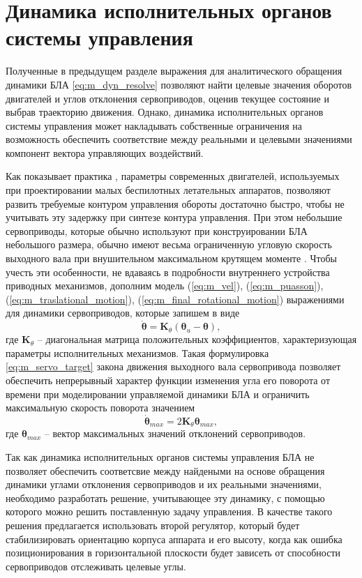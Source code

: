 \section{Динамика исполнительных органов системы управления}

Полученные в предыдущем разделе выражения для аналитического обращения динамики БЛА \eqref{eq:m_dyn_resolve} позволяют найти целевые значения оборотов двигателей и углов отклонения сервоприводов, оценив текущее состояние и выбрав траекторию движения.
Однако, динамика исполнительных органов системы управления может накладывать собственные ограничения на возможность обеспечить соответствие между реальными и целевыми значениями компонент вектора управляющих воздействий.

Как показывает практика \cite{Ryll01, Mellinger01}, параметры современных двигателей, используемых при проектировании малых беспилотных летательных аппаратов, позволяют развить требуемые контуром управления обороты достаточно быстро, чтобы не учитывать эту задержку при синтезе контура управления.
При этом небольшие сервоприводы, которые обычно используют при конструировании БЛА небольшого размера, обычно имеют весьма ограниченную угловую скорость выходного вала при внушительном максимальном крутящем моменте \cite{RobotShop}. Чтобы учесть эти особенности, не вдаваясь в подробности внутреннего устройства приводных механизмов, дополним модель
(\ref{eq:m_vel}),
(\ref{eq:m_puasson}),
(\ref{eq:m_traslational_motion}), (\ref{eq:m_final_rotational_motion})
выражениями для динамики сервоприводов, которые запишем в виде
\begin{equation} \label{eq:m_servo_target}
\dot{\bm{\theta}} = \bm{K}_{\theta} (\bm{\theta}_{u} - \bm{\theta}),
\end{equation}
где 
$\bm{K}_{\theta}$ -- диагональная матрица положительных коэффициентов, характеризующая параметры исполнительных механизмов.
Такая формулировка \eqref{eq:m_servo_target} закона движения выходного вала сервопривода позволяет обеспечить непрерывный характер функции изменения угла его поворота от времени при моделировании управляемой динамики БЛА и ограничить максимальную скорость поворота значением
\begin{equation} \label{eq:m_servo_dot_max}
\dot{\bm{\theta}}_{max} =
2 \bm{K}_{\theta}
\bm{\theta}_{max},
\end{equation}
где  $\bm{\theta}_{max}$ -- вектор максимальных значений отклонений сервоприводов.

Так как динамика исполнительных органов системы управления БЛА не позволяет обеспечить соответсвие между найдеными на основе обращения динамики углами отклонения сервоприводов и их реальными значениями, необходимо разработать решение, учитывающее эту динамику, с помощью которого можно решить поставленную задачу управления.
В качестве такого решения предлагается использовать второй регулятор, который будет стабилизировать ориентацию корпуса аппарата и его высоту, когда как ошибка позиционирования в горизонтальной плоскости будет зависеть от способности сервоприводов отслеживать целевые углы.

